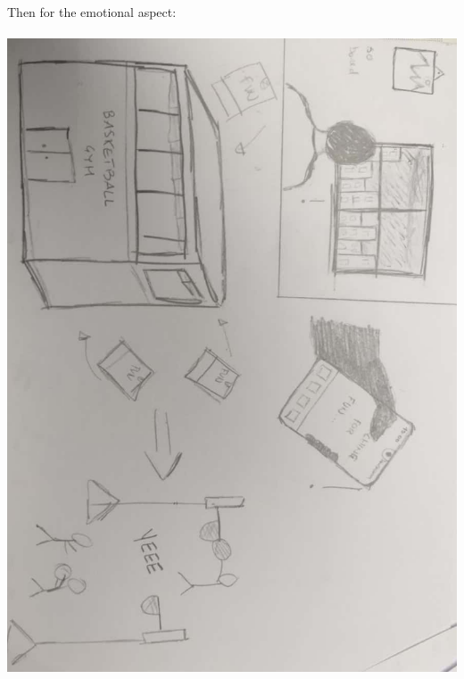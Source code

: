 \documentclass[12pt]{report}
\begin{document}
	Then for the emotional aspect:\\\\
	\includegraphics[scale=0.41]{Emotional.jpg}\break
	\newpage
\end{document}
